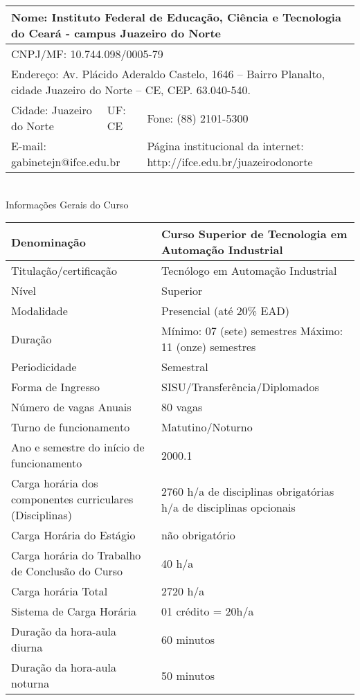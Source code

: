 \begin{tabular}{|p{5cm}|p{1.5cm}|p{7cm}|}
\hline 
\multicolumn{3}{|p{14cm}|}{Nome: Instituto Federal de Educação, Ciência e Tecnologia do Ceará - campus Juazeiro do Norte} \\ 
\hline 
\multicolumn{3}{|p{14cm}|}{CNPJ/MF: 10.744.098/0005-79} \\ 
\hline 
\multicolumn{3}{|p{14cm}|}{Endereço: Av. Plácido Aderaldo Castelo, 1646 – Bairro Planalto, cidade
Juazeiro do Norte – CE, CEP. 63.040-540.} \\ 
\hline 
Cidade: Juazeiro do Norte & UF:
CE & Fone: (88) 2101-5300 \\ 
\hline 
\multicolumn{2}{|p{7cm}|}{E-mail: gabinetejn@ifce.edu.br} & Página institucional da internet:
http://ifce.edu.br/juazeirodonorte \\ 
\hline 
\end{tabular} \\

\vspace{1cm}
Informações Gerais do Curso

\begin{tabular}{|p{7cm}|p{7cm}|}
\hline 
Denominação & Curso Superior de
Tecnologia em Automação
Industrial \\ 
\hline 
Titulação/certificação & Tecnólogo em Automação
Industrial \\ 
\hline 
Nível & Superior \\ 
\hline 
Modalidade & Presencial (até 20\% EAD) \\ 
\hline 
Duração & Mínimo: 07 (sete) semestres \newline
Máximo: 11 (onze) semestres \\ 
\hline 
Periodicidade & Semestral \\ 
\hline 
Forma de Ingresso & SISU/Transferência/Diplomados \\ 
\hline 
Número de vagas Anuais & 80 vagas \\ 
\hline 
Turno de funcionamento & Matutino/Noturno \\ 
\hline 
Ano e semestre do início de funcionamento & 2000.1 \\ 
\hline 
Carga horária dos
componentes curriculares
(Disciplinas) & 2760 h/a de
disciplinas
obrigatórias 
\newline
240 h/a de disciplinas opcionais \\ 
\hline 
Carga Horária do Estágio & não obrigatório \\ 
\hline 
Carga horária do Trabalho de Conclusão do Curso & 40 h/a \\ 
\hline 
Carga horária Total & 2720 h/a \\ 
\hline 
Sistema de Carga Horária & 01 crédito = 20h/a \\ 
\hline 
Duração da hora-aula diurna & 60 minutos \\ 
\hline 
Duração da hora-aula noturna & 50 minutos \\
\hline 
\end{tabular}

